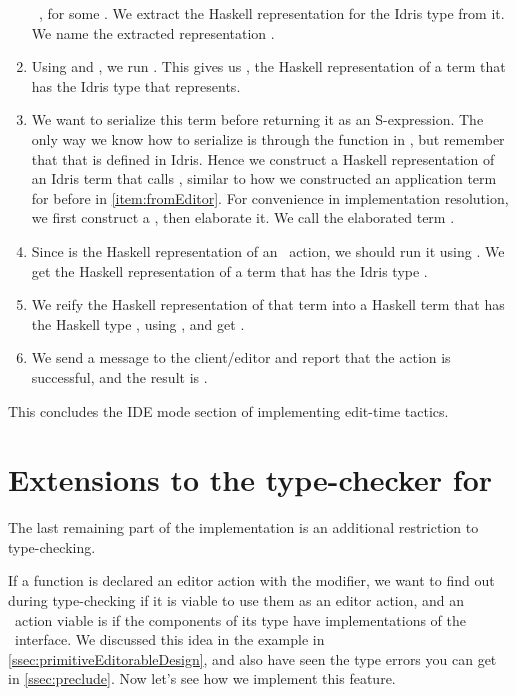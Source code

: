 \begin{enumerate}
    \texttt{ }, for some . We extract the Haskell
    representation for the Idris type  from it.  We name the extracted
    representation .
  \item Using  and , we run . This
    gives us , the Haskell representation of a term that has the Idris
    type that  represents.
  \item We want to serialize this term before returning it as an S-expression.
    The only way we know how to serialize is through the  function
    in , but remember that that is defined in Idris.
    Hence we construct a Haskell representation of an Idris term that calls
    , similar to how we constructed an application term for
     before in \autoref{item:fromEditor}.
    For convenience in implementation resolution, we first construct a
    , then elaborate it. We call the elaborated term .
  \item Since  is the Haskell representation of an \Elab\ action, we
    should run it using . We get the Haskell
    representation of a term that has the Idris type .
  \item We reify the Haskell representation of that term into a Haskell term
    that has the Haskell type , using , and get
    .
  \item We send a message to the client/editor and report that the action is
    successful, and the result is .
\end{enumerate}

This concludes the IDE mode section of implementing edit-time tactics.

\section{Extensions to the type-checker for }\label{sec:extCheck}

The last remaining part of the implementation is an additional restriction to
type-checking.

If a function is declared an editor action with the  modifier, we
want to find out during type-checking if it is viable to use them as an editor
action, and an \Elab\ action viable is if the components of its type have
implementations of the \Editorable\ interface. We discussed this idea in the
 example in \autoref{ssec:primitiveEditorableDesign}, and also have
seen the type errors you can get in \autoref{ssec:preclude}. Now let's see how
we implement this feature.

